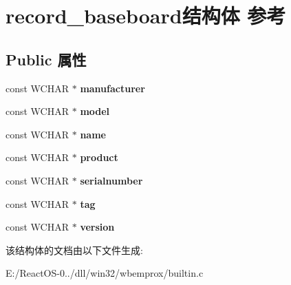 \hypertarget{structrecord__baseboard}{}\section{record\+\_\+baseboard结构体 参考}
\label{structrecord__baseboard}
\subsection*{Public 属性}
\begin{DoxyCompactItemize}
\item 
\mbox{\label{structrecord__baseboard_a579a1da0c4c4778dc04b8628a3fec02e}} 
const W\+C\+H\+AR $\ast$ {\bfseries manufacturer}
\item 
\mbox{\label{structrecord__baseboard_a509e02c70306467c01355c4d257b574c}} 
const W\+C\+H\+AR $\ast$ {\bfseries model}
\item 
\mbox{\label{structrecord__baseboard_ac5b5c31c3ba5f516ef22e26d337b2e9b}} 
const W\+C\+H\+AR $\ast$ {\bfseries name}
\item 
\mbox{\label{structrecord__baseboard_ae782eae29b3c9052690f428fc865e2e0}} 
const W\+C\+H\+AR $\ast$ {\bfseries product}
\item 
\mbox{\label{structrecord__baseboard_aab6fb682f1dad747bc367d4ddabd7c6c}} 
const W\+C\+H\+AR $\ast$ {\bfseries serialnumber}
\item 
\mbox{\label{structrecord__baseboard_a5a4fd1e762964dab5866159f5dc15200}} 
const W\+C\+H\+AR $\ast$ {\bfseries tag}
\item 
\mbox{\label{structrecord__baseboard_a70435c0a43981db4ece595927a8beaa3}} 
const W\+C\+H\+AR $\ast$ {\bfseries version}
\end{DoxyCompactItemize}


该结构体的文档由以下文件生成\+:\begin{DoxyCompactItemize}
\item 
E\+:/\+React\+O\+S-\/0../dll/win32/wbemprox/builtin.\+c\end{DoxyCompactItemize}
